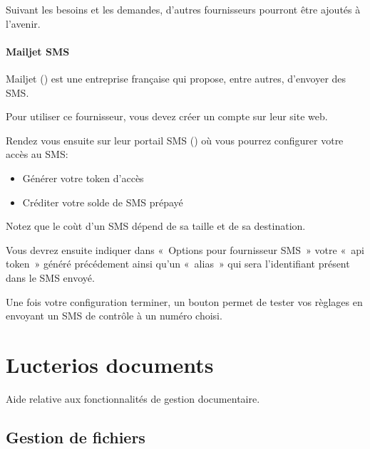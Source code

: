 \documentclass[letterpaper,10pt,french]{sphinxmanual}
\begin{document}
\sphinxAtStartPar
Suivant les besoins et les demandes, d’autres fournisseurs pourront être ajoutés à l’avenir.


\subsubsection{Mailjet SMS}
\label{\detokenize{mailing/configuration:mailjet-sms}}
\sphinxAtStartPar
Mailjet () est une entreprise française qui propose, entre autres, d’envoyer des SMS.

\sphinxAtStartPar
Pour utiliser ce fournisseur, vous devez créer un compte sur leur site web.

\sphinxAtStartPar
Rendez vous ensuite sur leur portail SMS () où vous pourrez configurer votre accès au SMS:
\begin{itemize}
\item {} 
\sphinxAtStartPar
Générer votre token d’accès

\item {} 
\sphinxAtStartPar
Créditer votre solde de SMS prépayé

\end{itemize}

\sphinxAtStartPar
Notez que le coùt d’un SMS dépend de sa taille et de sa destination.

\sphinxAtStartPar
Vous devrez ensuite indiquer dans « Options pour fournisseur SMS » votre « api token » généré précédement
ainsi qu’un « alias » qui sera l’identifiant présent dans le SMS envoyé.

\sphinxAtStartPar
Une fois votre configuration terminer, un bouton  permet de tester vos règlages en envoyant un SMS de contrôle à un numéro choisi.

\sphinxstepscope


\chapter{Lucterios documents}
\label{\detokenize{documents/index:lucterios-documents}}\label{\detokenize{documents/index::doc}}
\sphinxAtStartPar
Aide relative aux fonctionnalités de gestion documentaire.

\sphinxstepscope


\section{Gestion de fichiers}
\label{\detokenize{documents/shared_document:gestion-de-fichiers}}\label{\detokenize{documents/shared_document::doc}}
\end{document}

